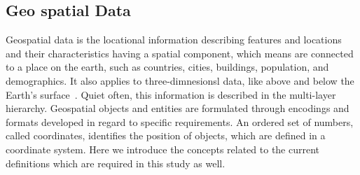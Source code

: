 \documentclass[a4paper,12pt]{article}
\begin{document}
\subsection{Geo spatial Data}
Geospatial data is the locational information describing features and locations and their characteristics having a spatial component, which means are connected to a place on the earth, such as countries, cities, buildings, population, and demographics. It also applies to three-dimnesionsl data, like above and below the Earth's surface~\cite{powell}. Quiet often, this information is described in the multi-layer hierarchy. Geospatial objects and entities are formulated through encodings and formats developed in regard to specific requirements. An ordered set of numbers, called coordinates, identifies the position of objects, which are defined in a coordinate system. Here we introduce the concepts related to the current definitions which are required in this study as well.
\end{document}
